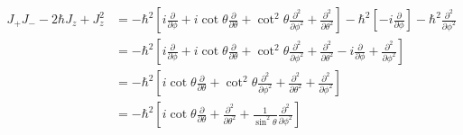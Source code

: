 \documentclass[letter, 10pts]{article}
\newcommand{\hb}{\hbar}
\begin{document}

\begin{align*}
J_+ J_-  - 2  \hb J_z + J_z^2 
&=- \hb^2 
\left[
 i \frac{\partial }{\partial \phi} 
+ i \cot \theta \frac{\partial}{\partial \theta}
+ \cot ^2 \theta \frac{\partial ^2}{\partial \phi^2}  
+ 
\frac{\partial ^2 }{\partial \theta ^2}
\right] 
- 
\hb^2 
\left[ 
-  i \frac{\partial}{\partial \phi }
\right]  
- \hb ^2 \frac{\partial^2}{\partial \phi^2}
\\
&=- \hb^2 
\left[
 i \frac{\partial }{\partial \phi} 
+ i \cot \theta \frac{\partial}{\partial \theta}
+ \cot ^2 \theta \frac{\partial ^2}{\partial \phi^2}  
+ 
\frac{\partial ^2 }{\partial \theta ^2}
- i \frac{\partial}{\partial \phi }
+
\frac{\partial^2}{\partial \phi^2}
\right]  
\\ 
&=- \hb^2 
\left[
 i \cot \theta \frac{\partial}{\partial \theta}
+ \cot ^2 \theta \frac{\partial ^2}{\partial \phi^2}  
+ 
\frac{\partial ^2 }{\partial \theta ^2}
+
\frac{\partial^2}{\partial \phi^2}
\right]  
\\
&=- \hb^2 
\left[
 i \cot \theta \frac{\partial}{\partial \theta}
+ 
\frac{\partial ^2 }{\partial \theta ^2}
+ 
\frac{1}{\sin ^2 \theta}
\frac{\partial^2}{\partial \phi^2}
\right]  
\\
\end{align*}
\end{document}
